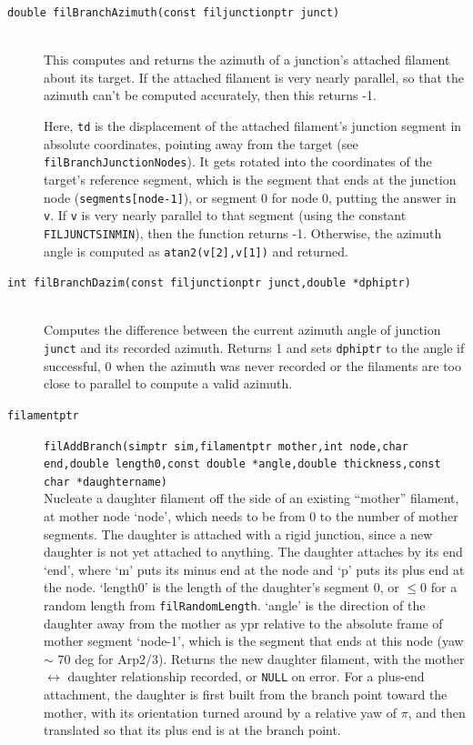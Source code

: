 \documentclass {scrbook}
\newcommand {\ttt} {\texttt}
\begin{document}
\begin{description}
\item[\ttt{double filBranchAzimuth(const filjunctionptr junct)}] %
\hfill \\
This computes and returns the azimuth of a junction's attached filament about its target. If the attached filament is very nearly parallel, so that the azimuth can't be computed accurately, then this returns -1.

Here, \ttt{td} is the displacement of the attached filament's junction segment in absolute coordinates, pointing away from the target (see \ttt{filBranchJunctionNodes}). It gets rotated into the coordinates of the target's reference segment, which is the segment that ends at the junction node (\ttt{segments[node-1]}), or segment 0 for node 0, putting the answer in \ttt{v}. If \ttt{v} is very nearly parallel to that segment (using the constant \ttt{FILJUNCTSINMIN}), then the function returns -1. Otherwise, the azimuth angle is computed as \ttt{atan2(v[2],v[1])} and returned.

\item[\ttt{int filBranchDazim(const filjunctionptr junct,double *dphiptr)}] %
\hfill \\
Computes the difference between the current azimuth angle of junction \ttt{junct} and its recorded azimuth. Returns 1 and sets \ttt{dphiptr} to the angle if successful, 0 when the azimuth was never recorded or the filaments are too close to parallel to compute a valid azimuth.

\item[\ttt{filamentptr}]
\ttt{filAddBranch(simptr sim,filamentptr mother,int node,char end,double length0,const double *angle,double thickness,const char *daughtername)}
\hfill \\
Nucleate a daughter filament off the side of an existing ``mother'' filament, at mother node `node', which needs to be from 0 to the number of mother segments. The daughter is attached with a rigid junction, since a new daughter is not yet attached to anything. The daughter attaches by its end `end', where `m' puts its minus end at the node and `p' puts its plus end at the node. `length0' is the length of the daughter's segment 0, or $\leq 0$ for a random length from \ttt{filRandomLength}. `angle' is the direction of the daughter away from the mother as ypr relative to the absolute frame of mother segment `node-1', which is the segment that ends at this node (yaw $\sim$ 70 deg for Arp2/3). Returns the new daughter filament, with the mother $\leftrightarrow$ daughter relationship recorded, or \ttt{NULL} on error. For a plus-end attachment, the daughter is first built from the branch point toward the mother, with its orientation turned around by a relative yaw of $\pi$, and then translated so that its plus end is at the branch point.%


\end{description}
\end{document}
